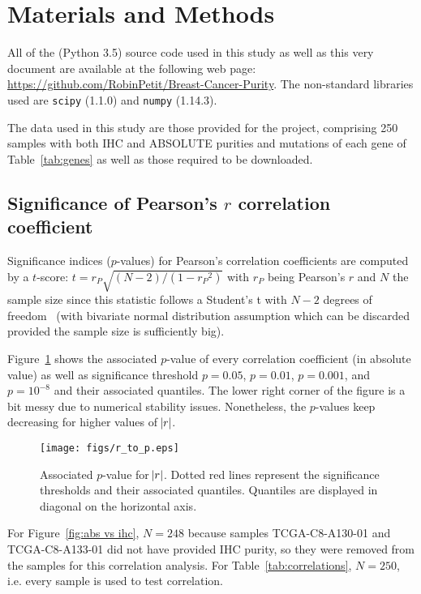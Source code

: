 \documentclass[letterpaper]{article}
\begin{document}
\section{Materials and Methods}
All of the (Python 3.5) source code used in this study as well as this very document are available at the following web page:
\url{https://github.com/RobinPetit/Breast-Cancer-Purity}. The non-standard libraries used are \texttt{scipy} (1.1.0) and
\texttt{numpy} (1.14.3).

The data used in this study are those provided for the project, comprising 250 samples with both IHC and ABSOLUTE purities and mutations of each gene of Table~\ref{tab:genes}
as well as those required to be downloaded.

\subsection{Significance of Pearson's $r$ correlation coefficient}
Significance indices ($p$-values) for Pearson's correlation coefficients are computed by a $t$-score: $t = r_P\sqrt{(N-2)/(1-{r_P}^2)}$ with $r_P$ being Pearson's $r$ and $N$
the sample size since this statistic follows a Student's t with $N-2$ degrees of freedom~\citep{lee1988thirteen} (with bivariate normal distribution assumption which
can be discarded provided the sample size is sufficiently big).

Figure~\ref{fig:r to p} shows the associated $p$-value of every correlation coefficient (in absolute value) as well as significance threshold $p = 0.05$, $p = 0.01$, $p = 0.001$,
and $p = 10^{-8}$ and their associated quantiles. The lower right corner of the figure is a bit messy due to numerical stability issues. Nonetheless, the $p$-values keep
decreasing for higher values of $\abs r$.

\begin{figure}[!h]
\texttt{[image: figs/r\_to\_p.eps]}
\caption{Associated $p$-value for $\abs r$. Dotted red lines represent the significance thresholds and their associated quantiles. Quantiles are displayed in diagonal
on the horizontal axis.\label{fig:r to p}}
\end{figure}

For Figure~\ref{fig:abs vs ihc}, $N=248$ because samples TCGA-C8-A130-01 and TCGA-C8-A133-01 did not have provided IHC purity, so they were removed from the samples
for this correlation analysis. For Table~\ref{tab:correlations}, $N = 250$, i.e. every sample is used to test correlation.
\end{document}
